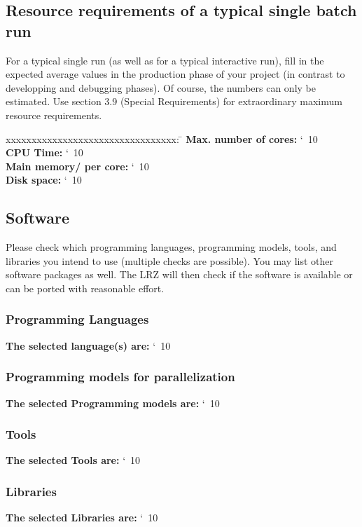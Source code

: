 \documentclass[accentcolor=tud9c,nochapname,11pt]{tudexercise}
\makeatletter
\newcommand\saferead[1]{%
  \bgroup
  \let\do\@makeother
  \dospecials\catcode`\ 10
  \egroup 
}
\makeatother
\begin{document}
\begin{Form}
\subsection{Resource requirements of a typical single batch run}
For a typical single run (as well as for a typical interactive run), fill in the expected average values in the production phase of your project (in contrast to developping and debugging phases). Of course, the numbers can only be estimated. Use section 3.9 (Special Requirements) for extraordinary maximum resource requirements. \\
\begin{tabbing}
xxxxxxxxxxxxxxxxxxxxxxxxxxxxxxxxx:  \= \kill
\textbf{Max. number of cores:} \saferead{req_maxcores.txt}  \\
\textbf{CPU Time:} \saferead{req_cputime.txt}  \\
\textbf{Main memory/ per core:} \saferead{req_mmpc.txt} \\
\textbf{Disk space:} \saferead{req_dspace.txt}\\
\end{tabbing}
\subsection{Software}
Please check which programming languages, programming models, tools, and libraries you intend to use (multiple checks are possible). You may list other software packages as well. The LRZ will then check if the software is available or can be ported with reasonable effort. \\
\subsubsection{Programming Languages}
\textbf{The selected language(s) are:} \saferead{proglang.txt} \\
\subsubsection{Programming models for parallelization}
\textbf{The selected Programming models are:} \saferead{progmodels.txt} \\
\subsubsection{Tools}
\textbf{The selected Tools are:} \saferead{tools.txt} \\
\subsubsection{Libraries}
\textbf{The selected Libraries are:} \saferead{libraries.txt}\\

\end{Form}
\end{document}
